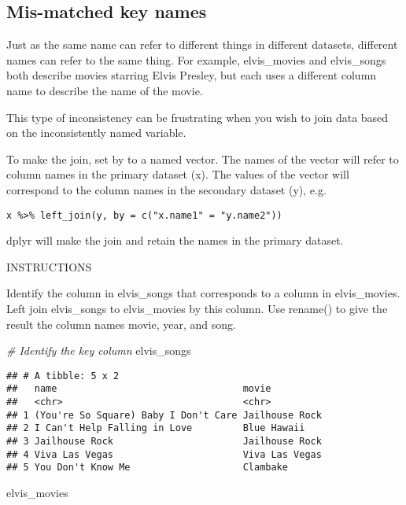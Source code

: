 \documentclass[]{article}
\newenvironment{Shaded}{\begin{snugshade}}{\end{snugshade}}
\newcommand{\CommentTok}[1]{\textcolor[rgb]{0.56,0.35,0.01}{\textit{#1}}}
\newcommand{\NormalTok}[1]{#1}
\begin{document}
\subsection{Mis-matched key names}\label{mis-matched-key-names}

Just as the same name can refer to different things in different
datasets, different names can refer to the same thing. For example,
elvis\_movies and elvis\_songs both describe movies starring Elvis
Presley, but each uses a different column name to describe the name of
the movie.

This type of inconsistency can be frustrating when you wish to join data
based on the inconsistently named variable.

To make the join, set by to a named vector. The names of the vector will
refer to column names in the primary dataset (x). The values of the
vector will correspond to the column names in the secondary dataset (y),
e.g.

\begin{verbatim}
x %>% left_join(y, by = c("x.name1" = "y.name2"))
\end{verbatim}

dplyr will make the join and retain the names in the primary dataset.

INSTRUCTIONS

Identify the column in elvis\_songs that corresponds to a column in
elvis\_movies. Left join elvis\_songs to elvis\_movies by this column.
Use rename() to give the result the column names movie, year, and song.

\begin{Shaded}
\begin{Highlighting}[]
\CommentTok{# Identify the key column}
\NormalTok{elvis_songs}
\end{Highlighting}
\end{Shaded}

\begin{verbatim}
## # A tibble: 5 x 2
##   name                                 movie         
##   <chr>                                <chr>         
## 1 (You're So Square) Baby I Don't Care Jailhouse Rock
## 2 I Can't Help Falling in Love         Blue Hawaii   
## 3 Jailhouse Rock                       Jailhouse Rock
## 4 Viva Las Vegas                       Viva Las Vegas
## 5 You Don't Know Me                    Clambake
\end{verbatim}

\begin{Shaded}
\begin{Highlighting}[]
\NormalTok{elvis_movies}
\end{Highlighting}
\end{Shaded}
\end{document}
